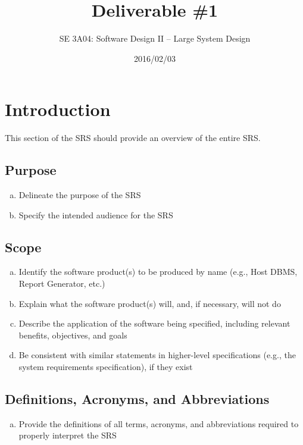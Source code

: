 \documentclass[]{article}
\title{Deliverable \#1}
\author{SE 3A04: Software Design II -- Large System Design}
\date{2016/02/03}
\begin{document}
\maketitle	

\section{Introduction}
\label{sec:introduction}

This section of the SRS should provide an overview of the entire SRS.

\subsection{Purpose}
\label{sub:purpose}
\begin{enumerate}[a)]
	\item Delineate the purpose of the SRS
	\item Specify the intended audience for the SRS
\end{enumerate}

\subsection{Scope}
\label{sub:scope}
\begin{enumerate}[a)]
	\item Identify the software product(s) to be produced by name (e.g., Host DBMS, Report Generator, etc.)
	\item Explain what the software product(s) will, and, if necessary, will not do
	\item Describe the application of the software being specified, including relevant benefits, objectives, and goals
	\item Be consistent with similar statements in higher-level specifications (e.g., the system requirements specification), if they exist
\end{enumerate}

\subsection{Definitions, Acronyms, and Abbreviations}
\label{sub:definitions_acronyms_and_abbreviations}
\begin{enumerate}[a)]
	\item Provide the definitions of all terms, acronyms, and abbreviations required to properly interpret the SRS
\end{enumerate}
\end{document}
